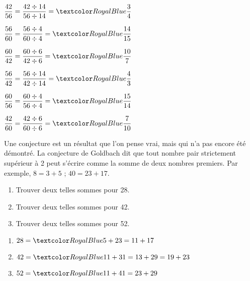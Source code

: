 \begin{Maquette}[Fiche,CorrigeFin,Colonnes=2]{}
\begin{multicols}{2}
      \begin{Solution}
         \begin{colenumerate}
            \item $\dfrac{42}{56} =\dfrac{42\div14}{56\div14} =\cor{\dfrac{3}{4}}$ \medskip
            \item $\dfrac{56}{60} =\dfrac{56\div4}{60\div4} =\cor{\dfrac{14}{15}}$ \medskip
            \item $\dfrac{60}{42} =\dfrac{60\div6}{42\div6} =\cor{\dfrac{10}{7}}$
            \item $\dfrac{56}{42} =\dfrac{56\div14}{42\div14} =\cor{\dfrac{4}{3}}$
            \item $\dfrac{60}{56} =\dfrac{60\div4}{56\div4} =\cor{\dfrac{15}{14}}$    
            \item $\dfrac{42}{60} =\dfrac{42\div6}{60\div6} =\cor{\dfrac{7}{10}}$
         \end{colenumerate}
      \end{Solution}


      \begin{exercice} %
         Une conjecture est un résultat que l'on pense vrai, mais qui n'a pas encore été démontré. La conjecture de Goldbach dit que tout nombre pair strictement supérieur à 2 peut s'écrire comme la somme de deux nombres premiers. Par exemple, $8 =3+5$ ; $40 =23+17$.
         \begin{enumerate}
            \item Trouver deux telles sommes pour 28.
            \item Trouver deux telles sommes pour 42.
            \item Trouver deux telles sommes pour 52.
         \end{enumerate}
      \end{exercice}

      \begin{Solution}
         \begin{enumerate}
            \item $28 =\cor{5+23 =11+17}$ \smallskip
            \item $42 =\cor{11+31 =13+29 =19+23}$ \smallskip
            \item $52 =\cor{11+41 = 23+29}$
         \end{enumerate}
      \end{Solution}



\end{multicols}
\end{Maquette}
